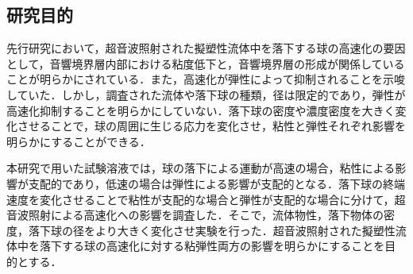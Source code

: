 \subsection{研究目的}

先行研究\cite{ref:8}において，超音波照射された擬塑性流体中を落下する球の高速化の要因として，音響境界層内部における粘度低下と，音響境界層の形成が関係していることが明らかにされている．また，高速化が弾性によって抑制されることを示唆していた．しかし，調査された流体や落下球の種類，径は限定的であり，弾性が高速化抑制することを明らかにしていない．落下球の密度や濃度密度を大きく変化させることで，球の周囲に生じる応力を変化させ，粘性と弾性それぞれ影響を明らかにすることができる．

本研究で用いた試験溶液では，球の落下による運動が高速の場合，粘性による影響が支配的であり，低速の場合は弾性による影響が支配的となる．落下球の終端速度を変化させることで粘性が支配的な場合と弾性が支配的な場合に分けて，超音波照射による高速化への影響を調査した．そこで，流体物性，落下物体の密度，落下球の径をより大きく変化させ実験を行った．超音波照射された擬塑性流体中を落下する球の高速化に対する粘弾性両方の影響を明らかにすることを目的とする．
